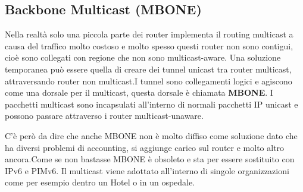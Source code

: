 \subsection{Backbone Multicast (MBONE)}
Nella realtà solo una piccola parte dei router implementa il routing multicast a causa del traffico molto costoso e molto spesso questi router non sono contigui, cioè sono collegati con regione che non sono multicast-aware. Una soluzione temporanea può essere quella di creare dei tunnel unicast tra router multicast, attraversando router non multicast.I tunnel sono collegamenti logici e agiscono come una dorsale per il multicast, questa dorsale è chiamata \textbf{MBONE}. I pacchetti multicast sono incapsulati all'interno di normali pacchetti IP unicast e possono passare attraverso i router multicast-unaware.

C'è però da dire che anche MBONE non è molto diffiso come soluzione dato che ha diversi problemi di accounting, si aggiunge carico sul router e molto altro ancora.Come se non bastasse MBONE è obsoleto e sta per essere sostituito con IPv6 e PIMv6. Il multicast viene adottato all'interno di singole organizzazioni come per esempio dentro un Hotel o in un ospedale.
